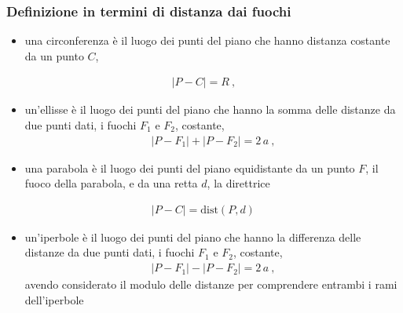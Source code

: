 \documentclass[letterpaper,10pt,english]{jupyterBook}
\begin{document}
\subsubsection*{Definizione in termini di distanza dai fuochi}
\begin{itemize}
\item {} 
\sphinxAtStartPar
una circonferenza è il luogo dei punti del piano che hanno distanza costante da un punto \(C\),

\end{itemize}
\begin{equation*}
\begin{split}|P - C| = R \ ,\end{split}
\end{equation*}\begin{itemize}
\item {} 
\sphinxAtStartPar
un’ellisse è il luogo dei punti del piano che hanno la somma delle distanze da due punti dati, i fuochi \(F_1\) e \(F_2\), costante,
\begin{equation*}
\begin{split}|P-F_1| + |P-F_2| = 2 \, a \ ,\end{split}
\end{equation*}
\item {} 
\sphinxAtStartPar
una parabola è il luogo dei punti del piano equidistante da un punto \(F\), il fuoco della parabola, e da una retta \(d\), la direttrice

\end{itemize}
\begin{equation*}
\begin{split}|P - C| = \text{dist}(P,d) \, \end{split}
\end{equation*}\begin{itemize}
\item {} 
\sphinxAtStartPar
un’iperbole è il luogo dei punti del piano che hanno la differenza delle distanze da due punti dati, i fuochi \(F_1\) e \(F_2\), costante,
\begin{equation*}
\begin{split}|P-F_1| - |P-F_2| = 2 \, a \ ,\end{split}
\end{equation*}
\sphinxAtStartPar
avendo considerato il modulo delle distanze per comprendere entrambi i rami dell’iperbole

\end{itemize}
\end{document}
